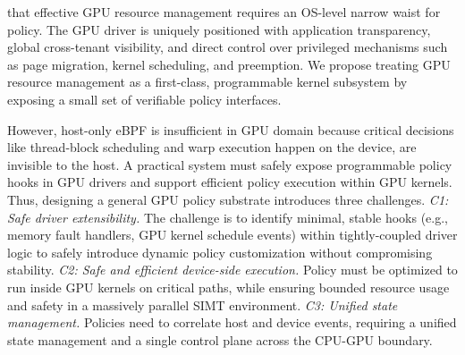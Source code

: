  that effective GPU resource management requires an OS-level narrow waist for policy. The GPU driver is uniquely positioned with application transparency, global cross-tenant visibility, and direct control over privileged mechanisms such as page migration, kernel scheduling, and preemption. We propose treating GPU resource management as a first-class, programmable kernel subsystem by exposing a small set of verifiable policy interfaces. 

However, host-only eBPF is insufficient in GPU domain because critical decisions like thread-block scheduling and warp execution happen on the device, are invisible to the host. 
A practical system must safely expose programmable policy hooks in GPU drivers and support efficient policy execution within GPU kernels. 
Thus, designing a general GPU policy substrate introduces three challenges.
\emph{C1: Safe driver extensibility.} The challenge is to identify minimal, stable hooks (e.g., memory fault handlers, GPU kernel schedule events) within tightly-coupled driver logic to safely introduce dynamic policy customization without compromising stability. \emph{C2: Safe and efficient device-side execution.} Policy must be optimized to run inside GPU kernels on critical paths, while ensuring bounded resource usage and safety in a massively parallel SIMT environment. \emph{C3: Unified state management.} Policies need to correlate host and device events, requiring a unified state management and a single control plane across the CPU-GPU boundary.

